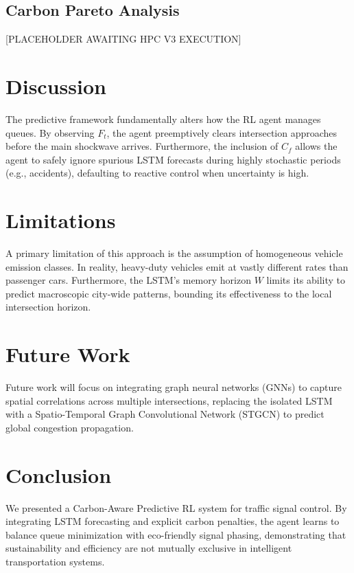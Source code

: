 \documentclass{ieeeaccess}
\begin{document}
\subsection{Carbon Pareto Analysis}
[PLACEHOLDER AWAITING HPC V3 EXECUTION]

\section{Discussion}
\label{sec:discussion}
The predictive framework fundamentally alters how the RL agent manages queues. By observing $F_t$, the agent preemptively clears intersection approaches before the main shockwave arrives. Furthermore, the inclusion of $C_f$ allows the agent to safely ignore spurious LSTM forecasts during highly stochastic periods (e.g., accidents), defaulting to reactive control when uncertainty is high.

\section{Limitations}
\label{sec:limitations}
A primary limitation of this approach is the assumption of homogeneous vehicle emission classes. In reality, heavy-duty vehicles emit at vastly different rates than passenger cars. Furthermore, the LSTM's memory horizon $W$ limits its ability to predict macroscopic city-wide patterns, bounding its effectiveness to the local intersection horizon.

\section{Future Work}
\label{sec:future_work}
Future work will focus on integrating graph neural networks (GNNs) to capture spatial correlations across multiple intersections, replacing the isolated LSTM with a Spatio-Temporal Graph Convolutional Network (STGCN) to predict global congestion propagation.

\section{Conclusion}
\label{sec:conclusion}
We presented a Carbon-Aware Predictive RL system for traffic signal control. By integrating LSTM forecasting and explicit carbon penalties, the agent learns to balance queue minimization with eco-friendly signal phasing, demonstrating that sustainability and efficiency are not mutually exclusive in intelligent transportation systems.



\end{document}
